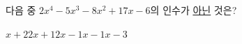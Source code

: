 다음 중 $2x^4-5x^3-8x^2+17x-6$의 인수가 \underline{아닌} 것은?
\begin{choices32}{$x+2$}{$2x+1$}{$2x-1$}{$x-1$}{$x-3$}\end{choices32}
